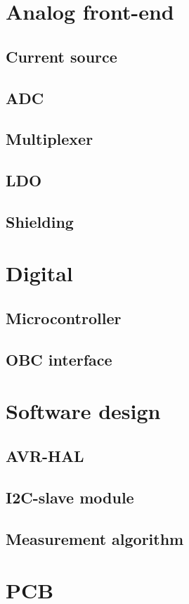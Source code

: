 \section{Analog front-end}
    \subsection{Current source}
    \subsection{ADC}
    \subsection{Multiplexer}
    \subsection{LDO}
    \subsection{Shielding}

\section{Digital}
    \subsection{Microcontroller}
    \subsection{OBC interface}

\section{Software design}
    \subsection{AVR-HAL}
    \subsection{I2C-slave module}
    \subsection{Measurement algorithm}

\section{PCB}
